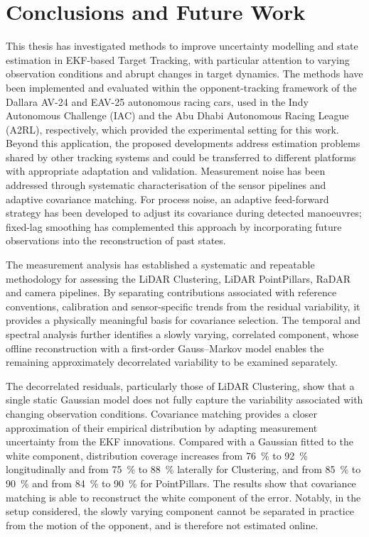 \chapter{Conclusions and Future Work}
\label{ch:conclusions}

This thesis has investigated methods to improve uncertainty modelling and state estimation in EKF-based Target Tracking, with particular attention to varying observation conditions and abrupt changes in target dynamics. The methods have been implemented and evaluated within the opponent-tracking framework of the Dallara AV-24 and EAV-25 autonomous racing cars, used in the Indy Autonomous Challenge (IAC) and the Abu Dhabi Autonomous Racing League (A2RL), respectively, which provided the experimental setting for this work. Beyond this application, the proposed developments address estimation problems shared by other tracking systems and could be transferred to different platforms with appropriate adaptation and validation. Measurement noise has been addressed through systematic characterisation of the sensor pipelines and adaptive covariance matching. For process noise, an adaptive feed-forward strategy has been developed to adjust its covariance during detected manoeuvres; fixed-lag smoothing has complemented this approach by incorporating future observations into the reconstruction of past states.

The measurement analysis has established a systematic and repeatable methodology for assessing the LiDAR Clustering, LiDAR PointPillars, RaDAR and camera pipelines. By separating contributions associated with reference conventions, calibration and sensor-specific trends from the residual variability, it provides a physically meaningful basis for covariance selection. The temporal and spectral analysis further identifies a slowly varying, correlated component, whose offline reconstruction with a first-order Gauss--Markov model enables the remaining approximately decorrelated variability to be examined separately.

The decorrelated residuals, particularly those of LiDAR Clustering, show that a single static Gaussian model does not fully capture the variability associated with changing observation conditions. Covariance matching provides a closer approximation of their empirical distribution by adapting measurement uncertainty from the EKF innovations. Compared with a Gaussian fitted to the white component, distribution coverage increases from \SI{76}{\percent} to \SI{92}{\percent} longitudinally and from \SI{75}{\percent} to \SI{88}{\percent} laterally for Clustering, and from \SI{85}{\percent} to \SI{90}{\percent} and from \SI{84}{\percent} to \SI{90}{\percent} for PointPillars. The results show that covariance matching is able to reconstruct the white component of the error. Notably, in the setup considered, the slowly varying component cannot be separated in practice from the motion of the opponent, and is therefore not estimated online.

